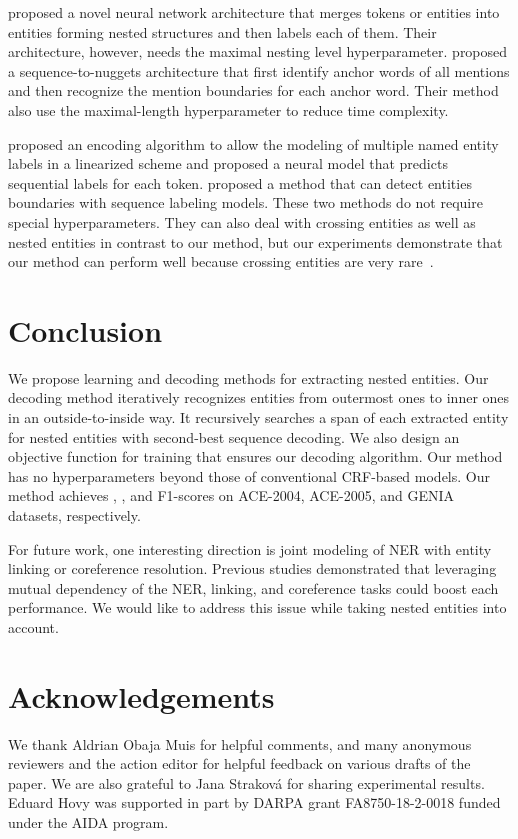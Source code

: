 \documentclass[11pt,a4paper]{article}
\begin{document}
\citet{fisher-vlachos-2019-merge} proposed a novel neural network architecture that merges tokens or entities into entities forming nested structures and then labels each of them.
Their architecture, however, needs the maximal nesting level hyperparameter.
\citet{lin-etal-2019-sequence} proposed a sequence-to-nuggets architecture that first identify anchor words of all mentions and then recognize the mention boundaries for each anchor word.
Their method also use the maximal-length hyperparameter to reduce time complexity.

\citet{strakova-etal-2019-neural} proposed an encoding algorithm to allow the modeling of multiple named entity labels in a linearized scheme and proposed a neural model that predicts sequential labels for each token.
\citet{zheng-etal-2019-boundary} proposed a method that can detect entities boundaries with sequence labeling models.
These two methods do not require special hyperparameters.
They can also deal with crossing entities as well as nested entities in contrast to our method, but our experiments demonstrate that our method can perform well because crossing entities are very rare~\cite{lu-roth-2015-joint,wang-etal-2018-neural-transition}.

\section{Conclusion}

We propose learning and decoding methods for extracting nested entities.
Our decoding method iteratively recognizes entities from outermost ones to inner ones in an outside-to-inside way.
It recursively searches a span of each extracted entity for nested entities with second-best sequence decoding.
We also design an objective function for training that ensures our decoding algorithm.
Our method has no hyperparameters beyond those of conventional CRF-based models.
Our method achieves , , and  F1-scores on ACE-2004, ACE-2005, and GENIA datasets, respectively.

For future work, one interesting direction is joint modeling of NER with entity linking or coreference resolution.
Previous studies \cite{durrett-klein-2014-joint,luo-etal-2015-joint,nguyen-etal-2016-j,martins-etal-2019-joint} demonstrated that leveraging mutual dependency of the NER, linking, and coreference tasks could boost each performance.
We would like to address this issue while taking nested entities into account.

\section*{Acknowledgements}
We thank Aldrian Obaja Muis for helpful comments, and many anonymous reviewers and the action editor for helpful feedback on various drafts of the paper. We are also grateful to Jana Strakov{\'a} for sharing experimental results. Eduard Hovy was supported in part by DARPA grant FA8750-18-2-0018 funded under the AIDA program.



\end{document}
